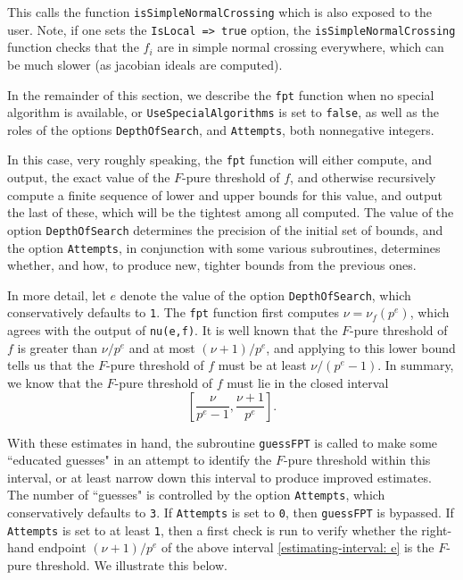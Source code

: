 \documentclass{amsart}
\begin{document}
This calls the function {\tt isSimpleNormalCrossing} which is also exposed to the user.  Note, if one sets the {\tt IsLocal => true} option, the {\tt isSimpleNormalCrossing} function checks that the $f_i$ are in simple normal crossing everywhere, which can be much slower (as jacobian ideals are computed).

In the remainder of this section, we describe the {\tt fpt} function when no special algorithm is available, or {\tt UseSpecialAlgorithms} is set to {\tt false},  as well as the roles of the options {\tt DepthOfSearch}, and {\tt Attempts}, both nonnegative integers.

In this case, very roughly speaking, the {\tt fpt} function will either compute, and output, the exact value of the $F$-pure threshold of $f$, and otherwise recursively compute a finite sequence of lower and upper bounds for this value, and output the last of these, which will be the tightest among all computed.  The value of the option {\tt DepthOfSearch} determines the precision of the initial set of bounds, and the option {\tt Attempts}, in conjunction with some various subroutines, determines whether, and how, to produce new, tighter bounds from the previous ones.

In more detail, let $e$ denote the value of the option {\tt DepthOfSearch}, which conservatively defaults to {\tt 1}.  The {\tt fpt} function first computes $\nu=\nu_f(p^e)$, which agrees with the output of {\tt nu(e,f)}.  It is well known that the $F$-pure threshold of $f$ is greater than $\nu/p^e$ and at most $(\nu+1)/p^e$, and applying  \cite[Proposition 4.2]{HernandezFPurityOfHypersurfaces} to this lower bound tells us that the $F$-pure threshold of $f$ must be at least $\nu/(p^e-1)$.  In summary, we know that the $F$-pure threshold of $f$ must lie in the closed interval
%
\begin{equation}
\label{estimating-interval: e}
\tag{$\dagger$}
\left[ \frac{\nu}{p^e-1}, \frac{\nu+1}{p^e} \right].
\end{equation}

With these estimates in hand, the subroutine {\tt guessFPT} is called to make some ``educated guesses" in an attempt to identify the $F$-pure threshold within this interval, or at least narrow down this interval to produce improved estimates.  The number of ``guesses" is controlled by the option {\tt Attempts}, which conservatively defaults to {\tt 3}.  If {\tt Attempts} is set to {\tt 0}, then {\tt guessFPT} is bypassed. If  {\tt Attempts} is set to at least {\tt 1}, then a first check is run to verify whether the right-hand endpoint $(\nu+1)/p^e$ of the above interval \eqref{estimating-interval: e} is the $F$-pure threshold.  We illustrate this below.
\end{document}
